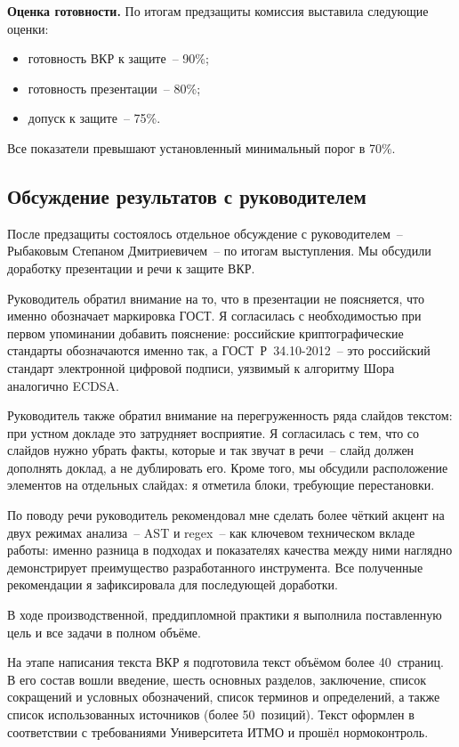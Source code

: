 \documentclass{itmo-vkr}
\begin{document}
\textbf{Оценка готовности.} По итогам предзащиты комиссия выставила следующие оценки:
\begin{itemize}
    \item готовность ВКР к защите~-- 90\%;
    \item готовность презентации~-- 80\%;
    \item допуск к защите~-- 75\%.
\end{itemize}

Все показатели превышают установленный минимальный порог в 70\%.

\subsection{Обсуждение результатов с руководителем}

После предзащиты состоялось отдельное обсуждение с руководителем~-- Рыбаковым Степаном Дмитриевичем~-- по итогам выступления. Мы обсудили доработку презентации и речи к защите ВКР.

Руководитель обратил внимание на то, что в презентации не поясняется, что именно обозначает маркировка ГОСТ. Я согласилась с необходимостью при первом упоминании добавить пояснение: российские криптографические стандарты обозначаются именно так, а ГОСТ~Р~34.10-2012~-- это российский стандарт электронной цифровой подписи, уязвимый к алгоритму Шора аналогично ECDSA.

Руководитель также обратил внимание на перегруженность ряда слайдов текстом: при устном докладе это затрудняет восприятие. Я согласилась с тем, что со слайдов нужно убрать факты, которые и так звучат в речи~-- слайд должен дополнять доклад, а не дублировать его. Кроме того, мы обсудили расположение элементов на отдельных слайдах: я отметила блоки, требующие перестановки.

По поводу речи руководитель рекомендовал мне сделать более чёткий акцент на двух режимах анализа~-- AST и regex~-- как ключевом техническом вкладе работы: именно разница в подходах и показателях качества между ними наглядно демонстрирует преимущество разработанного инструмента. Все полученные рекомендации я зафиксировала для последующей доработки.

\newpage


В ходе производственной, преддипломной практики я выполнила поставленную цель и все задачи в полном объёме.

На этапе написания текста ВКР я подготовила текст объёмом более 40~страниц. В его состав вошли введение, шесть основных разделов, заключение, список сокращений и условных обозначений, список терминов и определений, а также список использованных источников (более 50~позиций). Текст оформлен в соответствии с требованиями Университета ИТМО и прошёл нормоконтроль.
\end{document}
